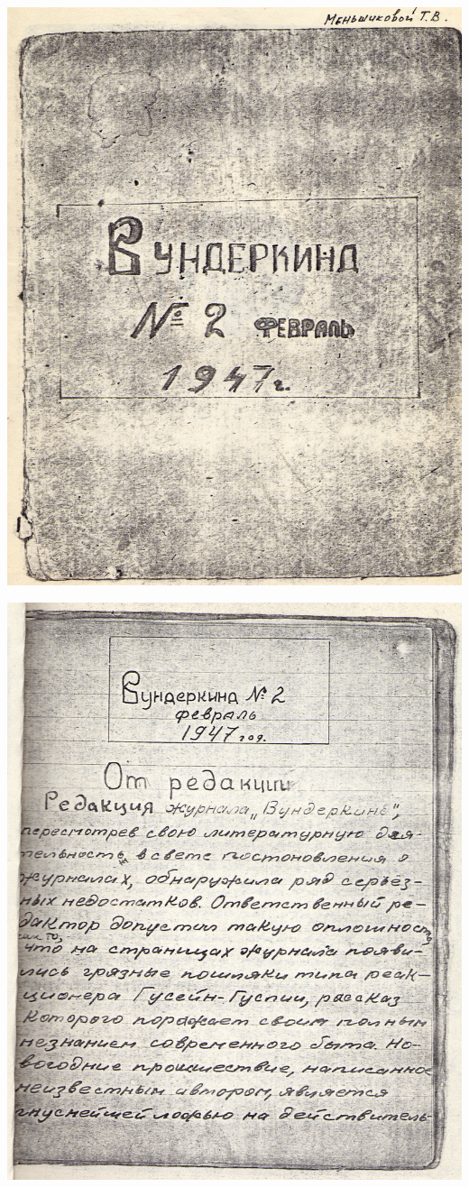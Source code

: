 \noindent
\includegraphics[width=\textwidth]{inc/Vynd/Vynd001}

\newpage

\noindent
\includegraphics[width=\textwidth]{inc/Vynd/Vynd002}

